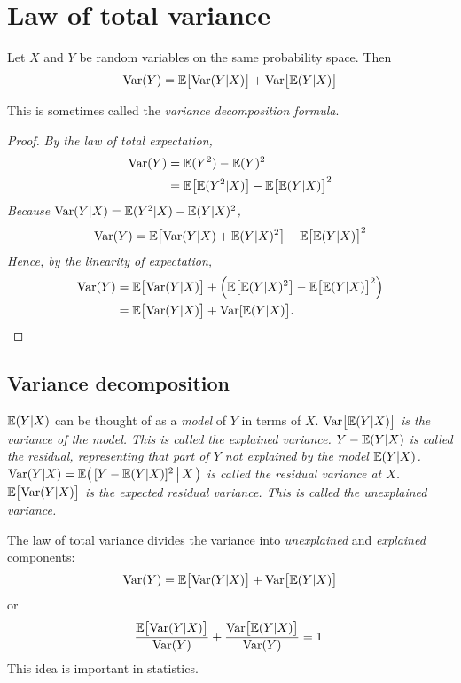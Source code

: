 \section{Law of total variance} 
\begin{theorem}
Let $X$ and $Y$ be random variables on the same probability space. Then
\[
\text{Var}(Y) = \mathbb{E}\big[\text{Var}(Y|X)\big] + \text{Var}\big[\mathbb{E}(Y|X)\big] 
\]
\end{theorem}
This is sometimes called the \emph{variance decomposition formula}.
\begin{proof}
\bit
\it By the law of total expectation,
\begin{align*}
\text{Var}(Y)
	& = \mathbb{E}(Y^2) - \mathbb{E}(Y)^2 \\
	& = \mathbb{E}\big[\mathbb{E}(Y^2|X)\big] - \mathbb{E}\big[\mathbb{E}(Y|X)\big]^2
\end{align*}
\it Because $\text{Var}(Y|X)=\mathbb{E}(Y^2|X) - \mathbb{E}(Y|X)^2$,
\[
\text{Var}(Y) = \mathbb{E}\big[\text{Var}(Y|X) + \mathbb{E}(Y|X)^2\big] - \mathbb{E}\big[\mathbb{E}(Y|X)\big]^2
\]
\it Hence, by the linearity of expectation,
\begin{align*}
\text{Var}(Y)
	& = \mathbb{E}\big[\text{Var}(Y|X)\big] + \Big(\mathbb{E}\big[\mathbb{E}(Y|X)^2\big] - \mathbb{E}\big[\mathbb{E}(Y|X)\big]^2\Big) \\
	& = \mathbb{E}\big[\text{Var}(Y|X)\big] + \text{Var}[\mathbb{E}(Y|X)\big].
\end{align*}
\eit
\vspace*{-2ex}
\end{proof}

\subsection{Variance decomposition} 
$\mathbb{E}(Y|X)$ can be thought of as a \emph{model} of $Y$ in terms of $X$.
\bit
\it $\text{Var}\big[\mathbb{E}(Y|X)\big]$ is the variance of the model. This is called the \emph{explained variance}.
\it $Y - \mathbb{E}(Y|X)$ is called the \emph{residual}, representing that part of $Y$ not explained by the model $\mathbb{E}(Y|X)$.
\it $ \text{Var}(Y|X) = \mathbb{E}\big(\,[Y-\mathbb{E}(Y|X)]^2\,\big|\,X\,\big)$ is called the \emph{residual variance} at $X$.
\it $\mathbb{E}\big[\text{Var}(Y|X)\big]$ is the expected residual variance. This is called the \emph{unexplained variance}.
\eit

\vspace*{2ex}
The law of total variance divides the variance into \emph{unexplained} and \emph{explained} components:
\[
\text{Var}(Y) = \mathbb{E}\big[\text{Var}(Y|X)\big] + \text{Var}\big[\mathbb{E}(Y|X)\big] 
\]
or
\[
\frac{\mathbb{E}\big[\text{Var}(Y|X)\big]}{\text{Var}(Y)} + \frac{\text{Var}\big[\mathbb{E}(Y|X)\big]}{\text{Var}(Y)} = 1.
\]
This idea is important in statistics.

